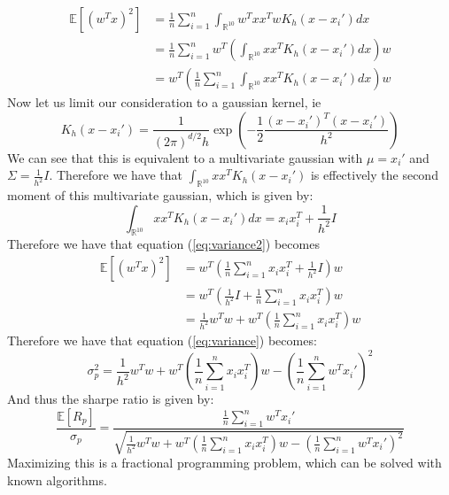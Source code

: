 \documentclass[12pt]{article}
\begin{document}
\begin{align}
    \mathbb{E}[(w^T x)^2] &= \frac{1}{n} \sum_{i=1}^n\int_{\mathbb{R}^{10}} w^Txx^Tw K_h(x-x_i') dx \\
    &= \frac{1}{n} \sum_{i=1}^nw^T\left(\int_{\mathbb{R}^{10}} xx^T K_h(x-x_i') dx\right)w\\
    &= w^T\left(\frac{1}{n}\sum_{i=1}^n\int_{\mathbb{R}^{10}} xx^T K_h(x-x_i') dx\right)w
    \label{eq:variance2}
\end{align}
Now let us limit our consideration to a gaussian kernel, ie
\begin{equation}
    K_h(x-x_i') = \frac{1}{(2\pi)^{d/2}h} \exp\left(-\frac{1}{2} \frac{(x-x_i')^T(x-x_i')}{h^2}\right)
\end{equation}
We can see that this is equivalent to a multivariate gaussian with $\mu=x_i'$ and $\Sigma=\frac{1}{h^2}I$. Therefore we have that $\int_{\mathbb{R}^{10}} xx^T K_h(x-x_i')$
is effectively the second moment of this multivariate gaussian, which is given by:
\begin{equation}
    \int_{\mathbb{R}^{10}} xx^T K_h(x-x_i') dx = x_ix_i^T + \frac{1}{h^2}I
\end{equation}
Therefore we have that 
equation (\ref{eq:variance2}) becomes
\begin{align}
    \mathbb{E}[(w^T x)^2]
    &= w^T\left(\frac{1}{n}\sum_{i=1}^nx_ix_i^T + \frac{1}{h^2}I\right)w\\
    &=  w^T\left(\frac{1}{h^2}I+\frac{1}{n}\sum_{i=1}^nx_ix_i^T\right)w\\
    &=  \frac{1}{h^2}w^Tw + w^T\left(\frac{1}{n}\sum_{i=1}^nx_ix_i^T\right)w
\end{align}
Therefore we have that equation (\ref{eq:variance}) becomes:
\begin{equation}
    \sigma_p^2 =\frac{1}{h^2}w^Tw + w^T\left(\frac{1}{n}\sum_{i=1}^nx_ix_i^T\right)w-\left(\frac{1}{n} \sum_{i=1}^nw^T x_i'\right)^2
\end{equation}
And thus the sharpe ratio is given by:
\begin{equation}
    \frac{\mathbb{E}[R_p]}{\sigma_p} = \frac{\frac{1}{n} \sum_{i=1}^nw^T x_i'}{\sqrt{\frac{1}{h^2}w^Tw + w^T\left(\frac{1}{n}\sum_{i=1}^nx_ix_i^T\right)w-\left(\frac{1}{n} \sum_{i=1}^nw^T x_i'\right)^2}}
\end{equation}
Maximizing this is a fractional programming problem, which can  be solved with known algorithms.
\end{document}
